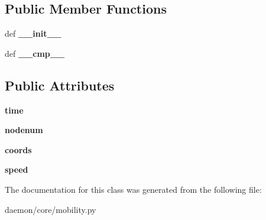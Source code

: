 \subsection*{Public Member Functions}
\begin{DoxyCompactItemize}
\item 
\hypertarget{classcore_1_1mobility_1_1_way_point_mobility_1_1_way_point_a17ecee74852654c65d9d52cf752c11d8}{def {\bfseries \+\_\+\+\_\+init\+\_\+\+\_\+}}\label{classcore_1_1mobility_1_1_way_point_mobility_1_1_way_point_a17ecee74852654c65d9d52cf752c11d8}

\item 
\hypertarget{classcore_1_1mobility_1_1_way_point_mobility_1_1_way_point_a72e1dfcaecdd54bdcbdd44a13ca97eec}{def {\bfseries \+\_\+\+\_\+cmp\+\_\+\+\_\+}}\label{classcore_1_1mobility_1_1_way_point_mobility_1_1_way_point_a72e1dfcaecdd54bdcbdd44a13ca97eec}

\end{DoxyCompactItemize}
\subsection*{Public Attributes}
\begin{DoxyCompactItemize}
\item 
\hypertarget{classcore_1_1mobility_1_1_way_point_mobility_1_1_way_point_a58de470bb00fb26fcf9e1fce64dc38f0}{{\bfseries time}}\label{classcore_1_1mobility_1_1_way_point_mobility_1_1_way_point_a58de470bb00fb26fcf9e1fce64dc38f0}

\item 
\hypertarget{classcore_1_1mobility_1_1_way_point_mobility_1_1_way_point_a7d1e13ca12ac2775a600484ccce5aff4}{{\bfseries nodenum}}\label{classcore_1_1mobility_1_1_way_point_mobility_1_1_way_point_a7d1e13ca12ac2775a600484ccce5aff4}

\item 
\hypertarget{classcore_1_1mobility_1_1_way_point_mobility_1_1_way_point_a491a0c75d7b3dea3e0232f2ae2b774c0}{{\bfseries coords}}\label{classcore_1_1mobility_1_1_way_point_mobility_1_1_way_point_a491a0c75d7b3dea3e0232f2ae2b774c0}

\item 
\hypertarget{classcore_1_1mobility_1_1_way_point_mobility_1_1_way_point_aa1558e3b736644081f20f7e8b6471261}{{\bfseries speed}}\label{classcore_1_1mobility_1_1_way_point_mobility_1_1_way_point_aa1558e3b736644081f20f7e8b6471261}

\end{DoxyCompactItemize}


The documentation for this class was generated from the following file\+:\begin{DoxyCompactItemize}
\item 
daemon/core/mobility.\+py\end{DoxyCompactItemize}
